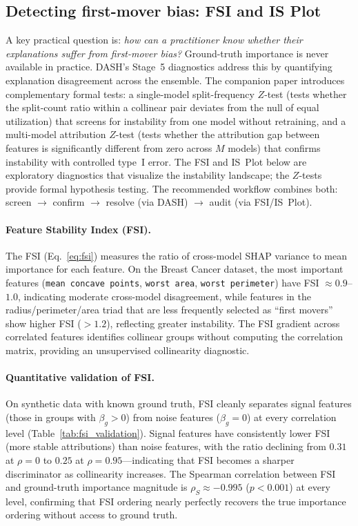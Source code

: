 \documentclass[11pt]{article}
\newcommand{\dash}{\textsc{DASH}}
\newcommand{\rhovar}{\rho}
\begin{document}
\subsection{Detecting first-mover bias: FSI and IS Plot}
\label{sec:diagnostics}

A key practical question is: \emph{how can a practitioner know whether
their explanations suffer from first-mover bias?} Ground-truth importance
is never available in practice. \dash{}'s Stage~5 diagnostics address this
by quantifying explanation disagreement across the ensemble.
The companion paper \citep{caraker2026impossibility} introduces
complementary formal tests: a single-model split-frequency $Z$-test
(tests whether the split-count ratio within a collinear pair
deviates from the null of equal utilization) that screens for
instability from one model without retraining, and a multi-model
attribution $Z$-test (tests whether the attribution gap between
features is significantly different from zero across $M$ models) that
confirms instability with controlled type~I error.  The FSI and IS~Plot below are exploratory
diagnostics that visualize the instability landscape; the $Z$-tests
provide formal hypothesis testing.  The recommended workflow
combines both: screen $\to$ confirm $\to$ resolve (via \dash{})
$\to$ audit (via FSI/IS~Plot).

\paragraph{Feature Stability Index (FSI).}
The FSI (Eq.~\ref{eq:fsi}) measures the ratio of cross-model SHAP
variance to mean importance for each feature. On the Breast Cancer
dataset, the most important features (\texttt{mean concave points},
\texttt{worst area}, \texttt{worst perimeter}) have FSI $\approx 0.9$--$1.0$,
indicating moderate cross-model disagreement, while features in the
radius/perimeter/area triad that are less frequently selected as
``first movers'' show higher FSI ($> 1.2$), reflecting greater
instability. The FSI gradient across correlated features
identifies collinear groups without computing the correlation matrix,
providing an unsupervised collinearity diagnostic.

\paragraph{Quantitative validation of FSI.}
On synthetic data with known ground truth, FSI cleanly separates signal
features (those in groups with $\beta_g > 0$) from noise features
($\beta_g = 0$) at every correlation level (Table~\ref{tab:fsi_validation}).
Signal features have consistently lower FSI (more stable attributions)
than noise features, with the ratio declining from $0.31$ at $\rhovar = 0$
to $0.25$ at $\rhovar = 0.95$---indicating that FSI becomes a sharper
discriminator as collinearity increases. The Spearman correlation between
FSI and ground-truth importance magnitude is $\rhovar_S \approx -0.995$
($p < 0.001$) at every level, confirming that FSI ordering nearly
perfectly recovers the true importance ordering without access to ground
truth.
\end{document}
